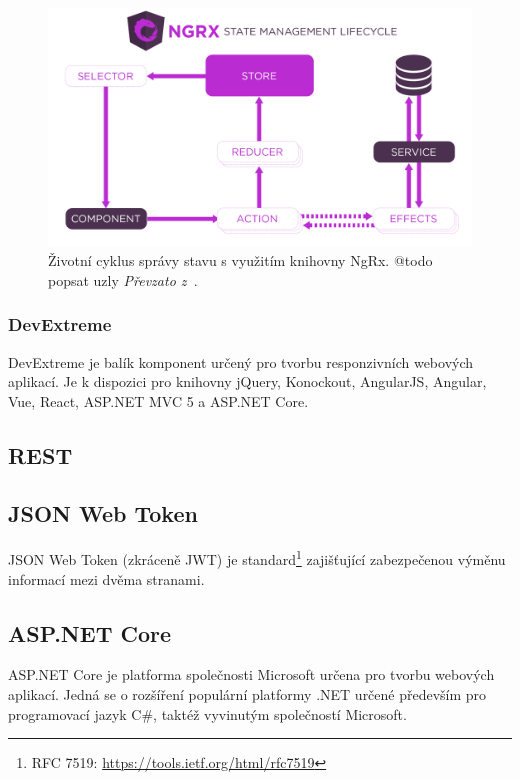 \blindtext
\begin{figure}[H]
	\centering
	\includegraphics[width=\textwidth]{obrazky-figures/ngrx-lifecycle.png}
	\caption{Životní cyklus správy stavu s využitím knihovny NgRx. @todo popsat uzly \emph{Převzato z~\cite{bib:ngrx-lifecycle}}.}
\end{figure}
\blindtext

\subsubsection{DevExtreme}
DevExtreme je balík komponent určený pro tvorbu responzivních webových aplikací. Je k dispozici pro knihovny jQuery, Konockout, AngularJS, Angular, Vue, React, ASP.NET MVC 5 a ASP.NET Core.  
\blindtext

\subsection{REST}
\blindtext[2]

\subsection{JSON Web Token}
JSON Web Token (zkráceně JWT) je standard\footnote{RFC 7519: \url{https://tools.ietf.org/html/rfc7519}} zajišťující zabezpečenou výměnu informací mezi dvěma stranami. 
\blindtext

\subsection{ASP.NET Core}
ASP.NET Core je platforma společnosti Microsoft určena pro tvorbu webových aplikací. Jedná se o rozšíření populární platformy .NET určené především pro programovací jazyk C\#, taktéž vyvinutým společností Microsoft.

